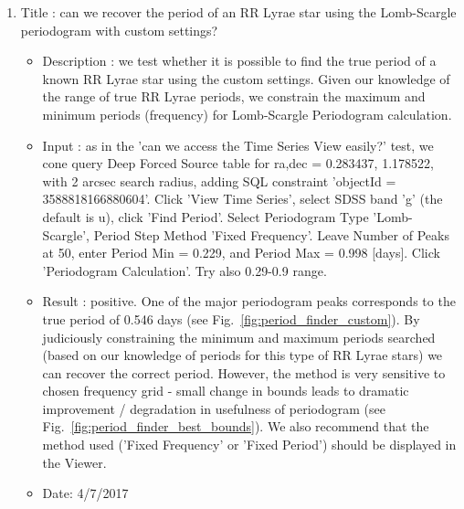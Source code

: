 \documentclass[DM,lsstdraft,toc,usenatbib]{lsstdoc}
\begin{document}
\begin{enumerate}
   \item Title : can we recover the period of an RR Lyrae  star using the Lomb-Scargle periodogram with custom settings? 
    \begin{itemize}
      \item Description :  we test whether it is possible to find the true period of a known RR Lyrae star using the custom  settings. Given our knowledge  of the range of true RR Lyrae periods, we constrain the maximum and minimum  periods (frequency) for  Lomb-Scargle Periodogram calculation.
      \item Input : as in the 'can we access the Time Series View easily?' test,  we cone query Deep Forced Source table for ra,dec = 0.283437\degree, 1.178522\degree, with 2 arcsec search radius, adding SQL constraint 'objectId = 3588818166880604'. Click 'View Time Series', select SDSS band 'g' (the default is u), click 'Find Period'. Select Periodogram Type 'Lomb-Scargle', Period Step Method 'Fixed Frequency'. Leave Number of Peaks at 50, enter Period Min = 0.229,  and Period Max = 0.998  [days]. Click 'Periodogram Calculation'. Try also 0.29-0.9  range. 
      \item Result : positive. One of the major periodogram peaks corresponds to the true period of 0.546 days (see Fig.~\ref{fig:period_finder_custom}). By judiciously constraining the minimum and maximum periods searched (based on our knowledge of periods for this type of RR Lyrae stars) we can recover the correct period. However, the method is very sensitive to chosen frequency grid - small change in bounds leads to dramatic improvement / degradation in usefulness of periodogram (see Fig.~\ref{fig:period_finder_best_bounds}). We also recommend that the method used ('Fixed Frequency' or 'Fixed Period') should be displayed in the Viewer.
      \item Date: 4/7/2017
    \end{itemize}



\end{enumerate}
\end{document}
